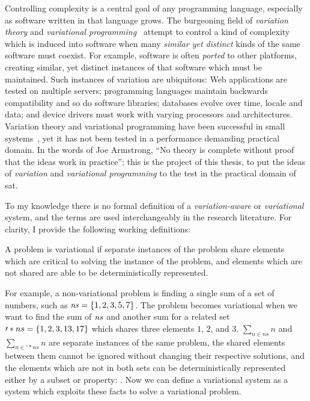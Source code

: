 \label{chapter:introduction}%
%
Controlling complexity is a central goal of any programming language, especially
as software written in that language grows. The burgeoning field of
\emph{variation theory} and \emph{variational
  programming}~\cite{EW11gttse,EW11tosem,HW16fosd,CEW16ecoop,Walk14onward}
attempt to control a kind of complexity which is induced into software when many
\emph{similar yet distinct} kinds of the same software must coexist. For
example, software is often \emph{ported} to other platforms, creating similar,
yet distinct instances of that software which must be maintained. Such instances
of variation are ubiquitous: Web applications are tested on multiple servers;
programming languages maintain backwards compatibility and so do software
libraries; databases evolve over time, locale and data; and device drivers must
work with varying processors and architectures. Variation theory and variational
programming have been successful in small
systems~\cite{ES18diagrams,SE17fosd,MMWWK17vamos}, yet it has not been tested in
a performance demanding practical domain. In the words of Joe
Armstrong\cite{armstrongThesis}, ``No theory is complete without proof that the
ideas work in practice''; this is the project of this thesis, to put the ideas
of \emph{variation} and \emph{variational programming} to the test in the
practical domain of \ac{sat}.

To my knowledge there is no formal definition of a \emph{variation-aware} or
\emph{variational} system, and the terms are used interchangeably in the
research literature. For clarity, I provide the following working definitions:

\begin{definition}
  A problem is variational if separate instances of the problem share elements
  which are critical to solving the instance of the problem, and elements which
  are not shared are able to be deterministically represented.
\end{definition}
%
For example, a non-variational problem is finding a single sum of a set of
numbers, such as $\kf{ns} = \set{1,2,3,5,7}$. The problem becomes variational
when we want to find the sum of $\mathit{ns}$ and another sum for a related set
$\prime*{ns} = \set{1,2,3,13,17}$ which shares three elements $1$, $2$, and $3$.
$\sum_{n \in{} ns} n$ and $\sum_{n \in{} \prime*{ns}} n$ are separate instances
of the same problem, the shared elements between them cannot be ignored without
changing their respective solutions, and the elements which are not in both sets
can be deterministically represented either by a subset or property: .
%
Now we can define a variational system as a system which exploits these facts to
solve a variational problem.

